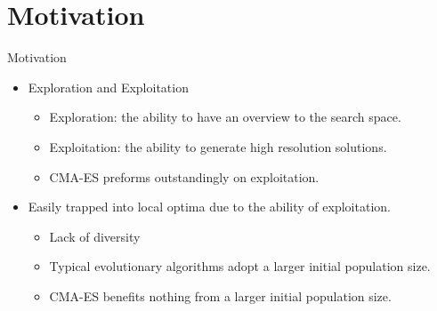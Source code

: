 \section{Motivation}

\begin{frame}{Motivation}

  \begin{itemize}
    \item Exploration and Exploitation
      \begin{itemize}
        \item Exploration: the ability to have an overview to the search
          space.
        \item Exploitation: the ability to generate high resolution
          solutions.
        \item CMA-ES preforms outstandingly on exploitation.
      \end{itemize}
      \vspace*{14pt}
    \item Easily trapped into local optima due to the ability of
      exploitation.
      \begin{itemize}
        \item Lack of diversity
        \item Typical evolutionary algorithms adopt a larger initial
          population size.
        \item CMA-ES benefits nothing from a larger initial population
          size.
      \end{itemize}
  \end{itemize}
\end{frame}

